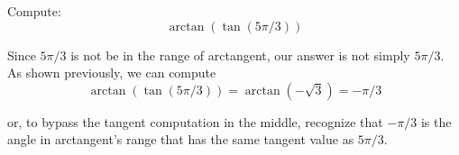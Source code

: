 \documentclass{ximera}
\begin{document}
\begin{example}
  Compute:
  \[
  \arctan(\tan(5\pi/3))
  \]
  \begin{explanation}
    Since $5\pi/3$ is not be in the range of
    arctangent, our answer is not simply $5\pi/3$. As shown previously, we can compute
    \[\arctan(\tan(5\pi/3))=\arctan(-\sqrt{3})=-\pi/3\]
    
    or, to bypass the tangent computation in the middle, recognize that $-\pi/3$ is the angle in arctangent's range that has the same tangent value as $5\pi/3$.
%    
%
%
%          

\end{explanation}
\end{example}
\end{document}
